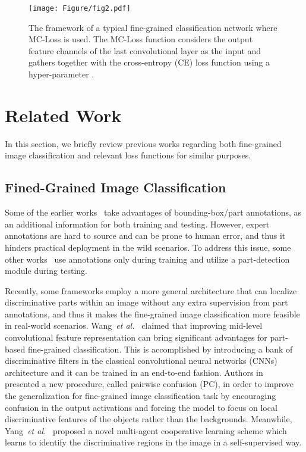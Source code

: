 \documentclass[journal]{IEEEtran}
\begin{document}
\begin{figure*}[!t]
  \centering
    \texttt{[image: Figure/fig2.pdf]}
  \caption{The framework of a typical fine-grained classification network where MC-Loss is used. The MC-Loss function considers the output feature channels of the last convolutional layer as the input and gathers together with the cross-entropy (CE) loss function using a hyper-parameter .}
  \label{fig:network}
\end{figure*}
\section{Related Work}\label{RelatedWork}

In this section, we briefly review previous works regarding both fine-grained image classification and relevant loss functions for similar purposes.
\subsection{Fined-Grained Image Classification}

Some of the earlier works~\cite{berg2013poof,chai2013symbiotic,xie2013hierarchical,min2017new} take advantages of bounding-box/part annotations, as an additional information for both training and testing. However, expert annotations are hard to source and can be prone to human error, and thus it hinders practical deployment in the wild scenarios. To address this issue, some other works~\cite{branson2014bird,zhang2014part} use annotations only during training and utilize a part-detection module during testing.

Recently, some frameworks employ a more general architecture that can localize discriminative parts within an image without any extra supervision from part annotations, and thus it makes the fine-grained image classification more feasible in real-world scenarios. Wang~\emph{et al.}~\cite{wang2018learning} claimed that improving mid-level convolutional feature representation can bring significant advantages for part-based fine-grained classification. This is accomplished by introducing a bank of discriminative filters in the classical convolutional neural networks (CNNs) architecture and it can be trained in an end-to-end fashion. Authors in~\cite{dubey2018pairwise} presented a new procedure, called pairwise confusion (PC), in order to improve the generalization for fine-grained image classification task by encouraging confusion in the output activations and forcing the model to focus on local discriminative features of the objects rather than the backgrounds. Meanwhile, Yang~\emph{et al.}~\cite{yang2018learning} proposed a novel multi-agent cooperative learning scheme which learns to identify the discriminative regions in the image in a self-supervised way.
\end{document}
